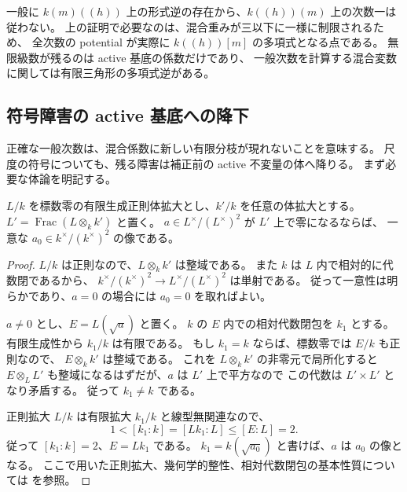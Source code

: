 \begin{remark}[形式逆だけを用いた議論との違い]
一般に $k(m)((h))$ 上の形式逆の存在から、$k((h))(m)$ 上の次数一は従わない。
上の証明で必要なのは、混合重みが三以下に一様に制限されるため、
全次数の potential が実際に $k((h))[m]$ の多項式となる点である。
無限級数が残るのは active 基底の係数だけであり、
一般次数を計算する混合変数に関しては有限三角形の多項式逆がある。
\end{remark}


\subsection{符号障害の active 基底への降下}

正確な一般次数は、混合係数に新しい有限分枝が現れないことを意味する。
尺度の符号についても、残る障害は補正前の active 不変量の体へ降りる。
まず必要な体論を明記する。

\begin{lemma}[定数体の拡大で消える二次類]
\label{lem:nfm-quadratic-class-constant-descent}
$L/k$ を標数零の有限生成正則体拡大とし、$k'/k$ を任意の体拡大とする。
$L'=\operatorname{Frac}(L\otimes_k k')$ と置く。
$a\in L^\times/(L^\times)^2$ が $L'$ 上で零になるならば、
一意な $a_0\in k^\times/(k^\times)^2$ の像である。
\end{lemma}

\begin{proof}
$L/k$ は正則なので、$L\otimes_k k'$ は整域である。
また $k$ は $L$ 内で相対的に代数閉であるから、
$k^\times/(k^\times)^2\to L^\times/(L^\times)^2$ は単射である。
従って一意性は明らかであり、$a=0$ の場合には $a_0=0$ を取ればよい。

$a\ne0$ とし、$E=L(\sqrt a)$ と置く。
$k$ の $E$ 内での相対代数閉包を $k_1$ とする。
有限生成性から $k_1/k$ は有限である。
もし $k_1=k$ ならば、標数零では $E/k$ も正則なので、
$E\otimes_k k'$ は整域である。
これを $L\otimes_k k'$ の非零元で局所化すると
$E\otimes_L L'$ も整域になるはずだが、$a$ は $L'$ 上で平方なので
この代数は $L'\times L'$ となり矛盾する。
従って $k_1\ne k$ である。

正則拡大 $L/k$ は有限拡大 $k_1/k$ と線型無関連なので、
\[
 1<[k_1:k]=[Lk_1:L]\le[E:L]=2.
\]
従って $[k_1:k]=2$、$E=Lk_1$ である。
$k_1=k(\sqrt{a_0})$ と書けば、$a$ は $a_0$ の像となる。
ここで用いた正則拡大、幾何学的整性、相対代数閉包の基本性質については
\cite[Tags~037P, 0322, 05DW]{NFMStacksRegularFields}を参照。
\end{proof}

